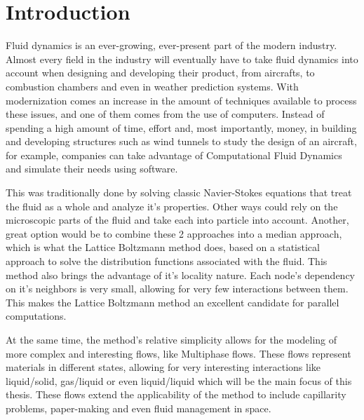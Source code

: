 \documentclass[12pt, openany]{book}
\begin{document}
%
%
\mainmatter

\chapter{Introduction}

Fluid dynamics is an ever-growing, ever-present part of the modern industry. Almost every field in the industry will eventually have to take fluid dynamics into account when designing and developing their product, from aircrafts, to combustion chambers and even in weather prediction systems. With modernization comes an increase in the amount of techniques available to process these issues, and one of them comes from the use of computers. Instead of spending a high amount of time, effort and, most importantly, money, in building and developing structures such as wind tunnels to study the design of an aircraft, for example, companies can take advantage of Computational Fluid Dynamics and simulate their needs using software. \par
This was traditionally done by solving classic Navier-Stokes equations that treat the fluid as a whole and analyze it's properties. Other ways could rely on the microscopic parts of the fluid and take each into particle into account. Another, great option would be to combine these 2 approaches into a median approach, which is what the Lattice Boltzmann method does, based on a statistical approach to solve the distribution functions associated with the fluid. This method also brings the advantage of it's locality nature. Each node's dependency on it's neighbors is very small, allowing for very few interactions between them. This makes the Lattice Boltzmann method an excellent candidate for parallel computations.\par
At the same time, the method's relative simplicity allows for the modeling of more complex and interesting flows, like Multiphase flows. These flows represent materials in different states, allowing for very interesting interactions like liquid/solid, gas/liquid or even liquid/liquid which will be the main focus of this thesis. These flows extend the applicability of the method to include capillarity problems, paper-making and even fluid management in space. \par
\end{document}
